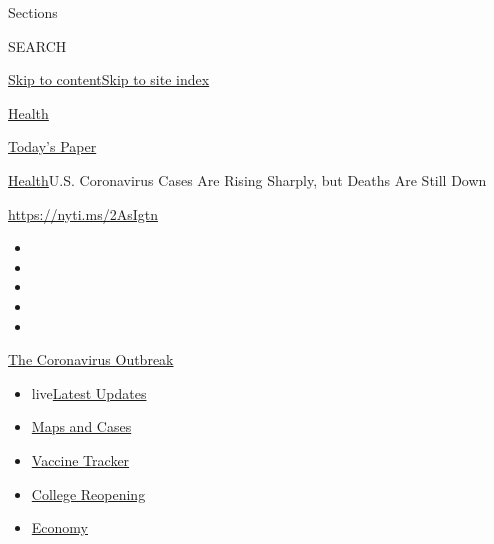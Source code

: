 Sections

SEARCH

\protect\hyperlink{site-content}{Skip to
content}\protect\hyperlink{site-index}{Skip to site index}

\href{https://www.nytimes.com/section/health}{Health}

\href{https://myaccount.nytimes.com/auth/login?response_type=cookie\&client_id=vi}{}

\href{https://www.nytimes.com/section/todayspaper}{Today's Paper}

\href{/section/health}{Health}\textbar{}U.S. Coronavirus Cases Are
Rising Sharply, but Deaths Are Still Down

\url{https://nyti.ms/2AsIgtn}

\begin{itemize}
\item
\item
\item
\item
\item
\end{itemize}

\href{https://www.nytimes.com/news-event/coronavirus?action=click\&pgtype=Article\&state=default\&region=TOP_BANNER\&context=storylines_menu}{The
Coronavirus Outbreak}

\begin{itemize}
\tightlist
\item
  live\href{https://www.nytimes.com/2020/08/04/world/coronavirus-cases.html?action=click\&pgtype=Article\&state=default\&region=TOP_BANNER\&context=storylines_menu}{Latest
  Updates}
\item
  \href{https://www.nytimes.com/interactive/2020/us/coronavirus-us-cases.html?action=click\&pgtype=Article\&state=default\&region=TOP_BANNER\&context=storylines_menu}{Maps
  and Cases}
\item
  \href{https://www.nytimes.com/interactive/2020/science/coronavirus-vaccine-tracker.html?action=click\&pgtype=Article\&state=default\&region=TOP_BANNER\&context=storylines_menu}{Vaccine
  Tracker}
\item
  \href{https://www.nytimes.com/2020/08/02/us/covid-college-reopening.html?action=click\&pgtype=Article\&state=default\&region=TOP_BANNER\&context=storylines_menu}{College
  Reopening}
\item
  \href{https://www.nytimes.com/live/2020/08/04/business/stock-market-today-coronavirus?action=click\&pgtype=Article\&state=default\&region=TOP_BANNER\&context=storylines_menu}{Economy}
\end{itemize}

